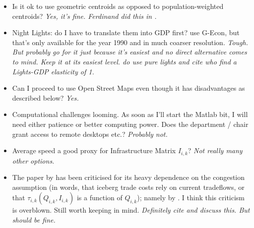 \documentclass[11pt, oneside]{article}   	%
\begin{document}
\begin{itemize}
\item Is it ok to use geometric centroids as opposed to population-weighted centroids? \textit{Yes, it's fine. Ferdinand did this in \cite{maurer_mice_2017}.}
\item Night Lights: do I have to translate them into GDP first? \cite{fajgelbaum_optimal_2017} use G-Econ, but that's only available for the year 1990 and in much coarser resolution. \textit{Tough. But probably go for it just because it's easiest and no direct alternative comes to mind. Keep it at its easiest level. \cite{kocornik-mina_flooded_2015} do use pure lights and cite \cite{henderson_measuring_2012} who find a Lights-GDP elasticity of 1.}
\item Can I proceed to use Open Street Maps even though it has disadvantages as described below? \textit{Yes.}
\item Computational challenges looming. As soon as I'll start the Matlab bit, I will need either patience or better computing power. Does the department / chair grant access to remote desktops etc.? \textit{Probably not.}
\item Average speed a good proxy for Infrastructure Matrix $I_{i,k}$? \textit{Not really many other options.}
\item The paper by \cite{fajgelbaum_optimal_2017} has been criticised for its heavy dependence on the congestion assumption (in words, that iceberg trade costs rely on current tradeflows, or that $\tau_{i,k}(Q_{i,k}, I_{i,k})$ is a function of $Q_{i,k}$); namely by \cite{allen_welfare_2016}. I think this criticism is overblown. Still worth keeping in mind. \textit{Definitely cite and discuss this. But should be fine.}

\end{itemize}

\vspace{\fill}

\begin{spacing}{1.0}
\setlength{\bibsep}{2.5pt plus 1.5ex}

\end{spacing}
\end{document}
